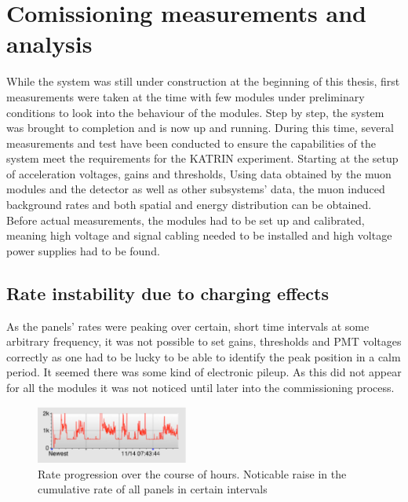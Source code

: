 %

\chapter{Comissioning measurements and analysis}
\label{ch:Analysis}

  While the system was still under construction at the beginning of this thesis, first measurements were taken at the time with few modules under preliminary conditions to look into the behaviour of the modules. Step by step, the system was brought to completion and is now up and running. During this time, several measurements and test have been conducted to ensure the capabilities of the system meet the requirements for the KATRIN experiment. Starting at the setup of acceleration voltages, gains and thresholds, 
  Using data obtained by the muon modules and the detector as well as other subsystems' data, the muon induced background rates and both spatial and energy distribution can be obtained. Before actual measurements, the modules had to be set up and calibrated, meaning high voltage and signal cabling needed to be installed and high voltage power supplies had to be found.
    \section{Rate instability due to charging effects}
    \label{ch:Analysis:sec:Rate instability due to charging effects}
  As the panels' rates were peaking over certain, short time intervals at some arbitrary frequency, it was not possible to set gains, thresholds and PMT voltages correctly as one had to be lucky to be able to identify the peak position in a calm period. It seemed there was some kind of electronic pileup. As this did not appear for all the modules it was not noticed until later into the commissioning process.
  \begin{figure}
   \centering
   \includegraphics[width=5cm]{graphics/setup/Noise_Rate_Problem_cutout.eps}
   \caption[Muon modules' rate: noise problems]{Rate progression over the course of hours. Noticable raise in the cumulative rate of all panels in certain intervals}
  \end{figure}
  
